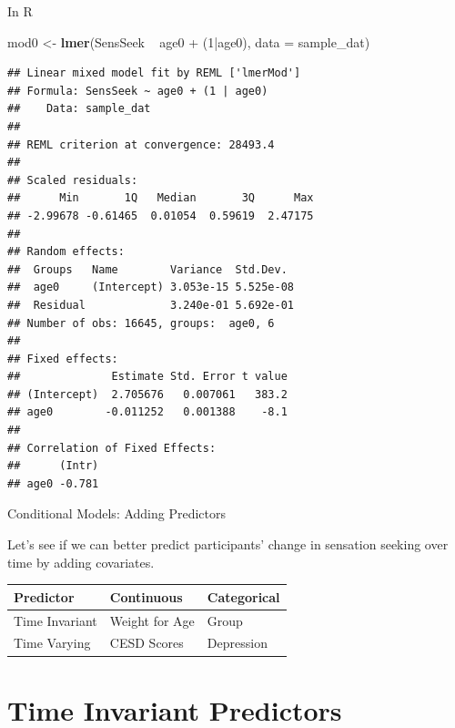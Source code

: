 \documentclass[ignorenonframetext,]{beamer}
\newenvironment{Shaded}{\begin{snugshade}}{\end{snugshade}}
\newcommand{\KeywordTok}[1]{\textcolor[rgb]{0.13,0.29,0.53}{\textbf{{#1}}}}
\newcommand{\DataTypeTok}[1]{\textcolor[rgb]{0.13,0.29,0.53}{{#1}}}
\newcommand{\DecValTok}[1]{\textcolor[rgb]{0.00,0.00,0.81}{{#1}}}
\newcommand{\StringTok}[1]{\textcolor[rgb]{0.31,0.60,0.02}{{#1}}}
\newcommand{\NormalTok}[1]{{#1}}
\begin{document}
\begin{frame}[fragile]{In R}

\small

\begin{Shaded}
\begin{Highlighting}[]
\NormalTok{mod0 <-}\StringTok{ }\KeywordTok{lmer}\NormalTok{(SensSeek ~}\StringTok{ }\NormalTok{age0 +}\StringTok{ }\NormalTok{(}\DecValTok{1}\NormalTok{|age0), }\DataTypeTok{data =} \NormalTok{sample_dat)}
\end{Highlighting}
\end{Shaded}

\centering
\tiny

\begin{verbatim}
## Linear mixed model fit by REML ['lmerMod']
## Formula: SensSeek ~ age0 + (1 | age0)
##    Data: sample_dat
## 
## REML criterion at convergence: 28493.4
## 
## Scaled residuals: 
##      Min       1Q   Median       3Q      Max 
## -2.99678 -0.61465  0.01054  0.59619  2.47175 
## 
## Random effects:
##  Groups   Name        Variance  Std.Dev. 
##  age0     (Intercept) 3.053e-15 5.525e-08
##  Residual             3.240e-01 5.692e-01
## Number of obs: 16645, groups:  age0, 6
## 
## Fixed effects:
##              Estimate Std. Error t value
## (Intercept)  2.705676   0.007061   383.2
## age0        -0.011252   0.001388    -8.1
## 
## Correlation of Fixed Effects:
##      (Intr)
## age0 -0.781
\end{verbatim}

\normalsize
\raggedleft

\end{frame}

\begin{frame}{Conditional Models: Adding Predictors}

Let's see if we can better predict participants' change in sensation
seeking over time by adding covariates.

\begin{longtable}[]{@{}lll@{}}
\toprule
Predictor & Continuous & Categorical\tabularnewline
\midrule
\endhead
Time Invariant & Weight for Age & Group\tabularnewline
Time Varying & CESD Scores & Depression\tabularnewline
\bottomrule
\end{longtable}

\end{frame}

\section{Time Invariant Predictors}\label{time-invariant-predictors}
\end{document}
